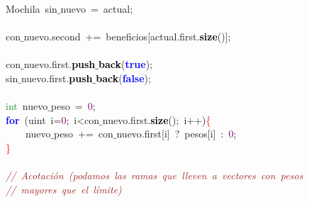 \mbox{}\ \ \ \ \ \ \ \ \ \ \ \ \textcolor{TealBlue}{Mochila}\ sin$\_$nuevo\ \textcolor{BrickRed}{=}\ actual\textcolor{BrickRed}{;} \\
\mbox{}\ \ \ \ \ \ \ \ \ \ \ \  \\
\mbox{}\ \ \ \ \ \ \ \ \ \ \ \ con$\_$nuevo\textcolor{BrickRed}{.}second\ \textcolor{BrickRed}{+=}\ beneficios\textcolor{BrickRed}{[}actual\textcolor{BrickRed}{.}first\textcolor{BrickRed}{.}\textbf{\textcolor{Black}{size}}\textcolor{BrickRed}{()];} \\
\mbox{}\ \ \ \ \ \ \ \ \ \ \ \  \\
\mbox{}\ \ \ \ \ \ \ \ \ \ \ \ con$\_$nuevo\textcolor{BrickRed}{.}first\textcolor{BrickRed}{.}\textbf{\textcolor{Black}{push$\_$back}}\textcolor{BrickRed}{(}\textbf{\textcolor{Blue}{true}}\textcolor{BrickRed}{);} \\
\mbox{}\ \ \ \ \ \ \ \ \ \ \ \ sin$\_$nuevo\textcolor{BrickRed}{.}first\textcolor{BrickRed}{.}\textbf{\textcolor{Black}{push$\_$back}}\textcolor{BrickRed}{(}\textbf{\textcolor{Blue}{false}}\textcolor{BrickRed}{);} \\
\mbox{}\ \ \ \ \ \ \ \ \ \ \ \  \\
\mbox{}\ \ \ \ \ \ \ \ \ \ \ \ \textcolor{ForestGreen}{int}\ nuevo$\_$peso\ \textcolor{BrickRed}{=}\ \textcolor{Purple}{0}\textcolor{BrickRed}{;} \\
\mbox{}\ \ \ \ \ \ \ \ \ \ \ \ \textbf{\textcolor{Blue}{for}}\ \textcolor{BrickRed}{(}\textcolor{TealBlue}{uint}\ i\textcolor{BrickRed}{=}\textcolor{Purple}{0}\textcolor{BrickRed}{;}\ i\textcolor{BrickRed}{\textless{}}con$\_$nuevo\textcolor{BrickRed}{.}first\textcolor{BrickRed}{.}\textbf{\textcolor{Black}{size}}\textcolor{BrickRed}{();}\ i\textcolor{BrickRed}{++)}\textcolor{Red}{\{} \\
\mbox{}\ \ \ \ \ \ \ \ \ \ \ \ \ \ \ \ nuevo$\_$peso\ \textcolor{BrickRed}{+=}\ con$\_$nuevo\textcolor{BrickRed}{.}first\textcolor{BrickRed}{[}i\textcolor{BrickRed}{]}\ \textcolor{BrickRed}{?}\ pesos\textcolor{BrickRed}{[}i\textcolor{BrickRed}{]}\ \textcolor{BrickRed}{:}\ \textcolor{Purple}{0}\textcolor{BrickRed}{;} \\
\mbox{}\ \ \ \ \ \ \ \ \ \ \ \ \textcolor{Red}{\}} \\
\mbox{}\ \ \ \ \ \ \ \ \ \ \ \  \\
\mbox{}\ \ \ \ \ \ \ \ \ \ \ \ \textit{\textcolor{Brown}{//\ Acotación\ (podamos\ las\ ramas\ que\ lleven\ a\ vectores\ con\ pesos}} \\
\mbox{}\ \ \ \ \ \ \ \ \ \ \ \ \textit{\textcolor{Brown}{//\ mayores\ que\ el\ límite)}} \\
